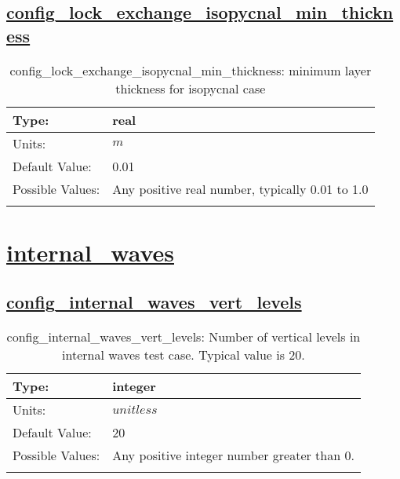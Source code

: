 \subsection[config\_lock\_exchange\_isopycnal\_min\_thickness]{\hyperref[sec:nm_tab_lock_exchange]{config\_lock\_exchange\_isopycnal\_min\_thickness}}
\label{subsec:nm_sec_config_lock_exchange_isopycnal_min_thickness}
\begin{center}
\begin{longtable}{| p{2.0in} || p{4.0in} |}
    \hline
    Type: & real \\
    \hline
    Units: & $m$ \\
    \hline
    Default Value: & 0.01 \\
    \hline
    Possible Values: & Any positive real number, typically 0.01 to 1.0 \\
    \hline
    \caption{config\_lock\_exchange\_isopycnal\_min\_thickness: minimum layer thickness for isopycnal case}
\end{longtable}
\end{center}
\section[internal\_waves]{\hyperref[sec:nm_tab_internal_waves]{internal\_waves}}
\label{sec:nm_sec_internal_waves}
\subsection[config\_internal\_waves\_vert\_levels]{\hyperref[sec:nm_tab_internal_waves]{config\_internal\_waves\_vert\_levels}}
\label{subsec:nm_sec_config_internal_waves_vert_levels}
\begin{center}
\begin{longtable}{| p{2.0in} || p{4.0in} |}
    \hline
    Type: & integer \\
    \hline
    Units: & $unitless$ \\
    \hline
    Default Value: & 20 \\
    \hline
    Possible Values: & Any positive integer number greater than 0. \\
    \hline
    \caption{config\_internal\_waves\_vert\_levels: Number of vertical levels in internal waves test case. Typical value is 20.}
\end{longtable}
\end{center}
